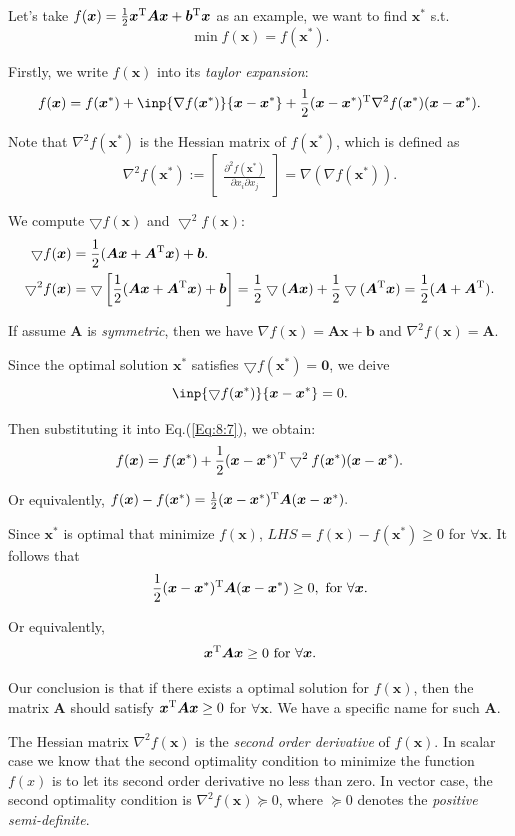 Let's take $f(\bm x)=\frac{1}{2}\bm x^{\mathrm T}\bm A\bm x+\bm b^{\mathrm T}\bm x$ as an example, we want to find $\bm x^{*}$ s.t. 
\[
\min f(\bm x)=f(\bm x^{*}).
\]

Firstly, we write $f(\bm x)$ into its \textit{taylor expansion}:
\begin{equation}
f(\bm x)=f(\bm x^{*})+\inp{\nabla f(\bm x^*)}{\bm x-\bm x^*}+\frac{1}{2}(\bm x-\bm x^*)\trans\nabla^2f(\bm x^*)(\bm x-\bm x^*).\label{Eq:8:7}
\end{equation}

Note that $\nabla^2f(\bm x^*)$ is the Hessian matrix of $f(\bm x^*)$, which is defined as 
\[
\nabla^2f(\bm x^*):=\begin{bmatrix}
\frac{\partial^2 f(\bm x^*)}{\partial x_{i}\partial x_{j}}
\end{bmatrix}=\nabla(\nabla f(\bm x^*)).
\]

We compute $\bigtriangledown f(\bm x)$ and $\bigtriangledown^2 f(\bm x)$:
\begin{align*}
\bigtriangledown f(\bm x)&=\frac{1}{2}(\bm{Ax}+\bm A^{\mathrm T}\bm x)+\bm b.\\
\bigtriangledown^2 f(\bm x)&=\bigtriangledown\left[\frac{1}{2}(\bm{Ax}+\bm A^{\mathrm T}\bm x)+\bm b\right]=\frac{1}{2}\bigtriangledown(\bm{Ax})+\frac{1}{2}\bigtriangledown(\bm A^{\mathrm T}\bm x)
=\frac{1}{2}(\bm A+\bm A^{\mathrm T}).
\end{align*}

If assume $\bm A$ is \emph{symmetric}, then we have $\nabla f(\bm x)=\bm A\bm x+\bm b$ and $\nabla^2 f(\bm x)=\bm A$.

Since the optimal solution $\bm x^*$ satisfies $\bigtriangledown f(\bm x^*)=\bm 0$, we deive 
\[\inp{\bigtriangledown f(\bm x^*)}{\bm x-\bm x^*}=0.\]

 Then substituting it into Eq.(\ref{Eq:8:7}), we obtain:
\[
f(\bm x)=f(\bm x^{*})+\frac{1}{2}(\bm x-\bm x^*)^{\mathrm T}\bigtriangledown^2f(\bm x^*)(\bm x-\bm x^*).
\]

Or equivalently, $f(\bm x)-f(\bm x^{*})=\frac{1}{2}(\bm x-\bm x^*)^{\mathrm T}\bm A(\bm x-\bm x^*).$

Since $\bm x^*$ is optimal that minimize $f(\bm x)$, $LHS=f(\bm x)-f(\bm x^*)\ge0$ for $\forall\bm x$. It follows that
\[ 
\frac{1}{2}(\bm x-\bm x^*)^{\mathrm T}\bm A(\bm x-\bm x^*)\ge0,\text{ for }\forall\bm x.
\]

Or equivalently,
\[
\bm x^{\mathrm T}\bm A\bm x\ge0 \text{ for $\forall\bm x$.}
\]

Our conclusion is that if there exists a optimal solution for $f(\bm x)$, then the matrix $\bm A$ should satisfy $\bm x^{\mathrm T}\bm A\bm x\ge0$ for $\forall\bm x.$ We have a specific name for such $\bm A$.
\begin{remark}
The Hessian matrix $\nabla^2f(\bm x)$ is the \emph{second order derivative} of $f(\bm x)$. In scalar case we know that the second optimality condition to minimize the function $f(x)$ is to let its second order derivative no less than zero. In vector case, the second optimality condition is $\nabla^2f(\bm x)\succeq0$, where $\succeq0$ denotes the \emph{positive semi-definite}.
\end{remark}
